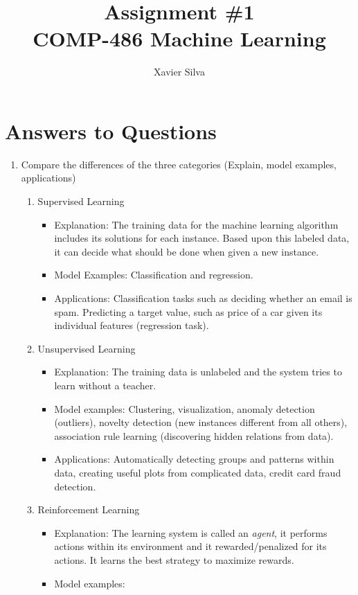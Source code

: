 \documentclass[a4paper,10pt]{article}
\title{Assignment \#1 \\ \large COMP-486 Machine Learning}
\author{Xavier Silva}
\begin{document}
\maketitle
\section*{Answers to Questions}
\begin{enumerate}
	\item Compare the differences of the three categories (Explain, model examples, applications)
	\begin{enumerate}
		\item Supervised Learning
		\begin{itemize}
			\item Explanation:
			The training data for the machine learning algorithm includes its solutions for each instance.
			Based upon this labeled data, it can decide what should be done when given a new instance.
			\item Model Examples:
			Classification and regression.
			\item Applications:
			Classification tasks such as deciding whether an email is spam.
			Predicting a target value, such as price of a car given its individual features (regression task).
		\end{itemize}
		\item Unsupervised Learning
		\begin{itemize}
			\item Explanation:
			The training data is unlabeled and the system tries to learn without a teacher.
			\item Model examples:
			Clustering, visualization, anomaly detection (outliers), novelty detection (new instances different from all others), association rule learning (discovering hidden relations from data).
			\item Applications:
			Automatically detecting groups and patterns within data, creating useful plots from complicated data, credit card fraud detection.
		\end{itemize}
		\item Reinforcement Learning
		\begin{itemize}
			\item Explanation:
			The learning system is called an \emph{agent}, it performs actions within its environment and it rewarded/penalized for its actions.
			It learns the best strategy to maximize rewards.
			\item Model examples: 

\end{itemize}
\end{enumerate}
\end{enumerate}
\end{document}
